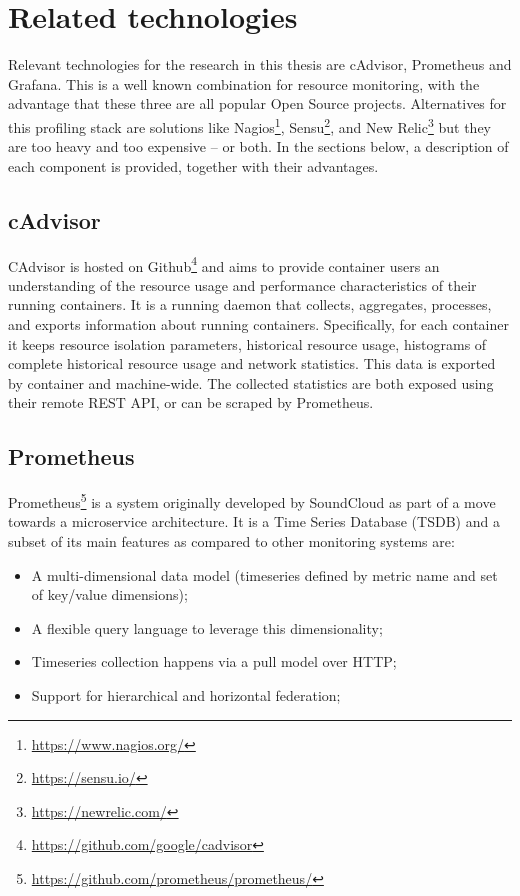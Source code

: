 \section{Related technologies} \label{sc:related_technologies}
Relevant technologies for the research in this thesis are cAdvisor, Prometheus and Grafana. This is a well known combination for resource monitoring, with the advantage that these three are all popular Open Source projects. Alternatives for this profiling stack are solutions like Nagios\footnote{\url{https://www.nagios.org/}}, Sensu\footnote{\url{https://sensu.io/}}, and New Relic\footnote{\url{https://newrelic.com/}} but they are too heavy and too expensive – or both. In the sections below, a description of each component is provided, together with their advantages.

\subsection{cAdvisor}
CAdvisor is hosted on Github\footnote{\url{https://github.com/google/cadvisor}} and aims to provide container users an understanding of the resource usage and performance characteristics of their running containers. It is a running daemon that collects, aggregates, processes, and exports information about running containers. Specifically, for each container it keeps resource isolation parameters, historical resource usage, histograms of complete historical resource usage and network statistics. This data is exported by container and machine-wide. The collected statistics are both exposed using their remote REST API, or can be scraped by Prometheus.

\subsection{Prometheus} 
Prometheus\footnote{\url{https://github.com/prometheus/prometheus/}} is a system originally developed by SoundCloud as part of a move towards a microservice architecture. It is a Time Series Database (TSDB) and a subset of its main features as compared to other monitoring systems are: 

\begin{itemize}
    \item A multi-dimensional data model (timeseries defined by metric name and set of key/value dimensions);
    \item A flexible query language to leverage this dimensionality;
    \item Timeseries collection happens via a pull model over HTTP;
    \item Support for hierarchical and horizontal federation;
\end{itemize}
    

